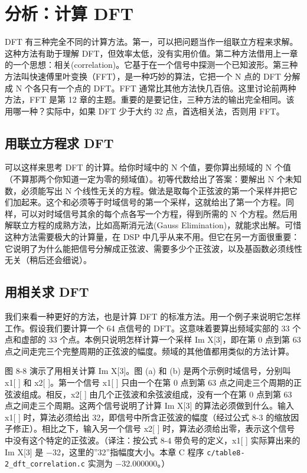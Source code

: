 \section{分析：计算 DFT}

DFT
有三种完全不同的计算方法。第一，可以把问题当作一组联立方程来求解。这种方法有助于理解
DFT，但效率太低，没有实用价值。第二种方法借用上一章的一个思想：相关(correlation)。它基于在一个信号中探测一个已知波形。第三种方法叫快速傅里叶变换（FFT），是一种巧妙的算法，它把一个
N 点的 DFT 分解成 N 个各只有一个点的 DFT。FFT
通常比其他方法快几百倍。这里讨论前两种方法，FFT 是第 12
章的主题。重要的是要记住，三种方法的输出完全相同。该用哪一种？实际中，如果
DFT 少于大约 32 点，首选相关法，否则用 FFT。

\subsection{用联立方程求 DFT}

可以这样来思考 DFT 的计算。给你时域中的 N 个值，要你算出频域的 N
个值（不算那两个你知道一定为零的频域值）。初等代数给出了答案：要解出 N
个未知数，必须能写出 N
个线性无关的方程。做法是取每个正弦波的第一个采样并把它们加起来。这个和必须等于时域信号的第一个采样，这就给出了第一个方程。同样，可以对时域信号其余的每个点各写一个方程，得到所需的
N 个方程。然后用解联立方程的成熟方法，比如高斯消元法(Gauss
Elimination)，就能求出解。可惜这种方法需要极大的计算量，在 DSP
中几乎从来不用。但它在另一方面很重要：它说明了为什么能把信号分解成正弦波、需要多少个正弦波，以及基函数必须线性无关（稍后还会细说）。

\subsection{用相关求 DFT}

我们来看一种更好的方法，也是计算 DFT
的标准方法。用一个例子来说明它怎样工作。假设我们要计算一个 64 点信号的
DFT。这意味着要算出频域实部的 33 个点和虚部的 33
个点。本例只说明怎样计算一个采样 Im X{[}3{]}，即在第 0 点到第 63
点之间走完三个完整周期的正弦波的幅度。频域的其他值都用类似的方法计算。

图 8-8 演示了用相关计算 Im X{[}3{]}。图 (a) 和 (b)
是两个示例时域信号，分别叫 x1{[} {]} 和 x2{[} {]}。第一个信号 x1{[} {]}
只由一个在第 0 点到第 63 点之间走三个周期的正弦波组成。相反，x2{[} {]}
由几个正弦波和余弦波组成，没有一个在第 0 点到第 63
点之间走三个周期。这两个信号说明了计算 Im X{[}3{]}
的算法必须做到什么。输入 x1{[} {]} 时，算法必须给出
32，即信号中所含正弦波的幅度（经过公式 8-3
的缩放因子修正）。相比之下，输入另一个信号 x2{[} {]}
时，算法必须给出零，表示这个信号中没有这个特定的正弦波。（译注：按公式
8-4 带负号的定义，x1{[} {]} 实际算出来的 Im X{[}3{]} 是
−32，这里的''32''指幅度大小。本章 C 程序
\texttt{c/table8-2\_dft\_correlation.c} 实测为 −32.000000。）

